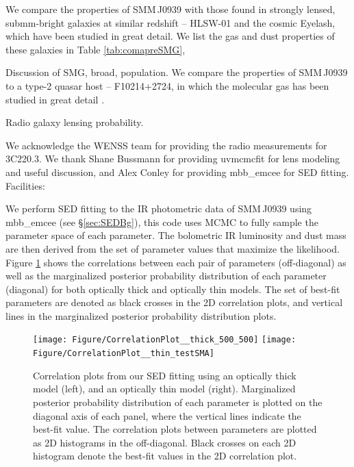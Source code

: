 \documentclass[twocolumn,apj,numberedappendix]{emulateapj}
\begin{document}

We compare the properties of SMM\,J0939 with those found in strongly lensed, submm-bright galaxies at similar redshift -- HLSW-01 and the cosmic Eyelash, which have been studied in great detail. We list the gas and dust properties of these galaxies in Table \ref{tab:comapreSMG}, 


Discussion of SMG, broad, population.
We compare the properties of SMM\,J0939 to a type-2 quasar host -- F10214+2724, in which the molecular gas has been studied in great detail \citep{Riechers11a}.  

Radio galaxy lensing probability.

\acknowledgments

We acknowledge the WENSS team for providing the radio measurements for 3C220.3. We thank Shane Bussmann for providing {\sc uvmcmcfit} for lens modeling and useful discussion, and Alex Conley for providing {\sc mbb\_emcee} for SED fitting.  
Facilities: 




\appendix

We perform SED fitting to the IR photometric data of SMM\,J0939 using {\sc mbb\_emcee} (see \S \ref{sec:SEDBg}), this code uses MCMC to fully sample the parameter space of each parameter. The bolometric IR luminosity and dust mass are then derived from the set of parameter values that maximize the likelihood. Figure \ref{fig:sedlikelihood} shows the correlations between each pair of parameters (off-diagonal) as well as the marginalized posterior probability distribution of each parameter (diagonal) for both optically thick and optically thin models. The set of best-fit parameters are denoted as black crosses in the 2D correlation plots, and vertical lines in the marginalized posterior probability distribution plots. 

\begin{figure}[!tbph]
\centering
\texttt{[image: Figure/CorrelationPlot\_\_thick\_500\_500]}
\texttt{[image: Figure/CorrelationPlot\_\_thin\_testSMA]}
\caption{Correlation plots from our SED fitting using an optically thick
model (left), and an optically thin model (right). Marginalized posterior probability 
distribution of each
parameter is plotted on the diagonal axis of each panel, where the vertical lines indicate the best-fit value. The correlation plots between parameters are plotted as 2D histograms in the off-diagonal. Black crosses on each 2D histogram denote the 
best-fit values in 
the 2D correlation plot.
\label{fig:sedlikelihood}}
\end{figure}
\end{document}
